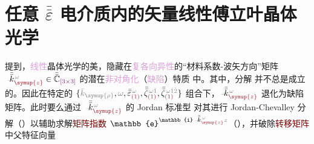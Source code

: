 \chapter{任意 \texorpdfstring{$\bar{\bar{\varepsilon}}$}{$\bar{\bar{\text{ε}}}$} 电介质内的矢量线性傅立叶晶体光学}\label{chap:LFCO}

 提到，\textcolor{Plum}{线性}\textcolor{PineGreen}{晶体光学}的美，隐藏在\textcolor{Plum}{复各向异性}的“材料系数-\textcolor{PineGreen}{波矢}方向”矩阵 $\Xint{\begin{smallmatrix} ~ \\ {}^{}_{\mathcolor{gray}{-}} \\ ~ \end{smallmatrix}}{15}{\bar{\bar{k}}}_{\textcolor{Maroon}{\symup{z}}}^{\;\! \mathcolor{gray}{\omega}} \in \bar{\bar{\mathbb{C}}}_{\textcolor{Plum}{\left[3 \times 3\right]}}$ 的潜在\textcolor{Plum}{非对角化}（\textcolor{Plum}{缺陷}）特质  中。其中，分解  并不总是成立的。因此在特定的 $\{\mathcolor{gray}{\bar{k}_{\symup{\rho}}}, \mathcolor{gray}{\omega}, \bar{\bar{\varepsilon}}^{\;\! \mathcolor{gray}{\omega}}_{\textcolor{Maroon}{(1)}}, \bar{\bar{\zeta}}^{\;\! \mathcolor{gray}{\omega} \mathcolor{gray}{\check{1}}}_{\textcolor{Maroon}{(1)}}, \bar{\bar{\zeta}}^{\;\! \mathcolor{gray}{\omega} \mathcolor{gray}{\check{1} \check{2}}}_{\textcolor{Maroon}{(1)}}\}$ 组合\cite{grundmannSingularOpticalAxes2016}下，$\Xint{\begin{smallmatrix} ~ \\ {}^{}_{\mathcolor{gray}{-}} \\ ~ \end{smallmatrix}}{15}{\bar{\bar{k}}}_{\textcolor{Maroon}{\symup{z}}}^{\;\! \mathcolor{gray}{\omega}}$ 退化为缺陷矩阵。此时要么通过 $\Xint{\begin{smallmatrix} ~ \\ {}^{}_{\mathcolor{gray}{-}} \\ ~ \end{smallmatrix}}{15}{\bar{\bar{k}}}_{\textcolor{Maroon}{\symup{z}}}^{\;\! \mathcolor{gray}{\omega}}$ 的 \textcolor{PineGreen}{Jordan 标准型}  对其进行 \textcolor{PineGreen}{Jordan-Chevalley 分解}\cite{wiersigDistanceExceptionalPoints2022,wiersigRevisitingHierarchicalConstruction2022,wiersigMovingExceptionalSurface2023,wiersigReviewExceptionalPointbased2020,kirillovGeometricalOpticsStability2025,keckUnfoldingDiabolicPoint2003,kirillovUnfoldingEigenvalueSurfaces2005}（）以辅助求解\textcolor{Maroon}{矩阵指数} $\mathbb{e}^{\mathbb{i} \Xint{\begin{smallmatrix} ~ \\ {}^{}_{\mathcolor{gray}{-}} \\ ~ \end{smallmatrix}}{15}{\bar{\bar{k}}}_{\textcolor{Maroon}{\symup{z}}}^{\;\! \mathcolor{gray}{\omega}} \mathcolor{gray}{z}}$（），并破除\textcolor{Maroon}{转移矩阵}  中父\textcolor{PineGreen}{特征向量} 